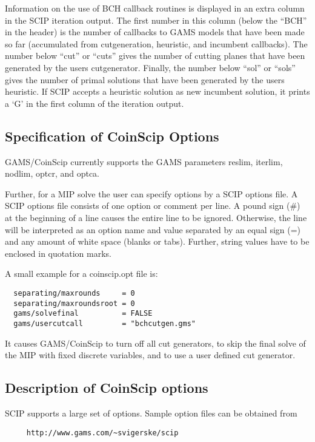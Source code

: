 Information on the use of BCH callback routines is displayed in an extra column in the SCIP iteration output.
The first number in this column (below the ``BCH'' in the header) is the number of callbacks to GAMS models that have been made so far (accumulated from cutgeneration, heuristic, and incumbent callbacks).
The number below ``cut'' or ``cuts'' gives the number of cutting planes that have been generated by the users cutgenerator.
Finally, the number below ``sol'' or ``sols'' gives the number of primal solutions that have been generated by the users heuristic.
If SCIP accepts a heuristic solution as new incumbent solution, it prints a `G' in the first column of the iteration output.

\subsection{Specification of CoinScip Options}

GAMS/CoinScip currently supports the GAMS parameters reslim, iterlim, nodlim, optcr, and optca.

Further, for a MIP solve the user can specify options by a SCIP options file.
A SCIP options file consists of one option or comment per line.
A pound sign (\#) at the beginning of a line causes the entire line to be ignored.
Otherwise, the line will be interpreted as an option name and value separated by an equal sign (=) and any amount of white space (blanks or tabs).
Further, string values have to be enclosed in quotation marks.

A small example for a coinscip.opt file is:
\begin{verbatim}
  separating/maxrounds     = 0
  separating/maxroundsroot = 0
  gams/solvefinal          = FALSE
  gams/usercutcall         = "bchcutgen.gms"
\end{verbatim}
It causes GAMS/CoinScip to turn off all cut generators, to skip the final solve of the MIP with fixed discrete variables, and to use a user defined cut generator.

\subsection{Description of CoinScip options}

SCIP supports a large set of options.
Sample option files can be obtained from
\begin{verbatim}
     http://www.gams.com/~svigerske/scip
\end{verbatim}

